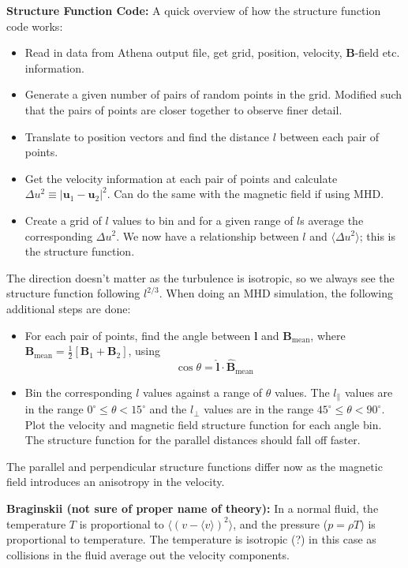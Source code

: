 \documentclass[12pt,letterpaper]{article}
\newcommand{\B}[1]{\mathbf{#1}}
\begin{document}
  \textbf{Structure Function Code:} A quick overview of how the structure function code works:
  \begin{itemize}
    \item Read in data from Athena output file, get grid, position, velocity, $\B{B}$-field etc. information.

    \item Generate a given number of pairs of random points in the grid. Modified such that the pairs of points are closer together to observe finer detail.

    \item Translate to position vectors and find the distance $l$ between each pair of points.

    \item Get the velocity information at each pair of points and calculate $\Delta u^2 \equiv |\B{u}_1 - \B{u}_2|^2$. Can do the same with the magnetic field if using MHD.

    \item Create a grid of $l$ values to bin and for a given range of $l$s average the corresponding $\Delta u^2$. We now have a relationship between $l$ and $\langle \Delta u^2 \rangle$; this is the structure function.
  \end{itemize}
  The direction doesn't matter as the turbulence is isotropic, so we always see the structure function following $l^{2/3}$.
  When doing an MHD simulation, the following additional steps are done:

  \begin{itemize}
    \item For each pair of points, find the angle between $\B{l}$ and $\B{B}_{\text{mean}}$, where $\B{B}_{\text{mean}} = \frac{1}{2}[\B{B}_1 + \B{B}_2]$, using
    $$
      \cos \theta = \hat{\B{l}} \cdot \hat{\B{B}}_{\text{mean}}
    $$

    \item Bin the corresponding $l$ values against a range of $\theta$ values. The $l_{\|}$ values are in the range $0^\circ\leq \theta < 15^\circ$ and the $l_\perp$ values are in the range $45^\circ\leq \theta < 90^\circ$. Plot the velocity and magnetic field structure function for each angle bin. The structure function for the parallel distances should fall off faster.
  \end{itemize}
  The parallel and perpendicular structure functions differ now as the magnetic field introduces an anisotropy in the velocity.

  \textbf{Braginskii (not sure of proper name of theory):} In a normal fluid, the temperature $T$ is proportional to $\langle (v - \langle v \rangle)^2 \rangle$, and the pressure ($p = \rho T$) is proportional to temperature. The temperature is isotropic (?) in this case as collisions in the fluid average out the velocity components.
\end{document}
